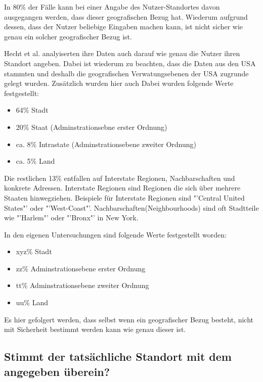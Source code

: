 			In 80\% der Fälle kann bei einer Angabe des Nutzer-Standortes davon ausgegangen werden, dass dieser geografischen Bezug hat.
			Wiederum aufgrund dessen, dass der Nutzer beliebige Eingaben machen kann, ist nicht sicher wie genau ein solcher geografischer Bezug ist. 
			
			Hecht et al. analyiserten ihre Daten auch darauf wie genau die Nutzer ihren Standort angeben.
			Dabei ist wiederum zu beachten, dass die Daten aus den USA stammten und deshalb die geografischen Verwatungsebenen der USA zugrunde gelegt wurden.
			Zusätzlich wurden hier auch 
			Dabei wurden folgende Werte festgestellt:

			\begin{itemize}
			 	\item 64\% Stadt 
			 	\item 20\% Staat (Adminstrationsebne erster Ordnung)
			 	\item ca. 8\% Intrastate (Adminstrationsebene zweiter Ordnung)
			 	\item ca. 5\% Land
			 \end{itemize} 

			 Die restlichen 13\% entfallen auf Interstate Regionen, Nachbarschaften und konkrete Adressen. 
			 Interstate Regionen sind Regionen die sich über mehrere Staaten hinwegziehen. 
			 Beispiele für Interstate Regionen sind "'Central United States"' oder "'West-Coast"'.
			 Nachbarschaften(Neighbourhoods) sind oft Stadtteile wie "'Harlem"' oder "'Bronx"' in New York.

			 In den eigenen Untersuchungen sind folgende Werte festgestellt worden:

			\begin{itemize}
			 	\item xyz\% Stadt 
			 	\item zz\% Adminstrationsebene erster Ordnung
			 	\item tt\% Adminstrationsebene zweiter Ordnung
			 	\item uu\% Land
			 \end{itemize} 

			Es hier gefolgert werden, dass selbst wenn ein geografischer Bezug besteht, nicht mit Sicherheit bestimmt werden kann wie genau dieser ist.

		\subsection{Stimmt der tatsächliche Standort mit dem angegeben überein?}


